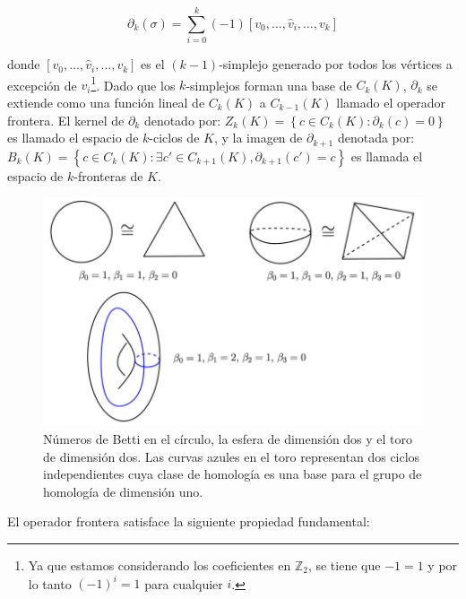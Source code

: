 \begin{equation*}
    \partial_{k}\left(\sigma\right) = \sum_{i=0}^{k}\left(-1\right)
    \left[v_{0},\dots,\hat{v}_{i},\dots,v_{k}\right]
\end{equation*}

\noindent donde $\left[v_{0},\dots,\hat{v}_{i},\dots,v_{k}\right]$ es el $\left(k-1\right)$-simplejo
generado por todos los v\'ertices a excepci\'on de $v_{i}$\footnote{Ya que estamos considerando
los coeficientes en $\mathbb{Z}_{2}$, se tiene que $-1=1$ y por lo tanto $\left(-1\right)^{i}=1$
para cualquier $i$.}. Dado que los $k$-simplejos forman una base de $C_{k}\left(K\right)$,
$\partial_{k}$ se extiende como una funci\'on lineal de $C_{k}\left(K\right)$ a $C_{k-1}\left(K\right)$
llamado el operador frontera. El kernel de $\partial_{k}$ denotado por: $Z_{k}\left(K\right)=
\left\{c\in C_{k}\left(K\right):\partial_{k}\left(c\right)=0\right\}$ es llamado el espacio de
$k$-ciclos de $K$, y la imagen de $\partial_{k+1}$ denotada por: $B_{k}\left(K\right)=
\left\{c\in C_{k}\left(K\right): \exists c' \in C_{k+1}\left(K\right),
\partial_{k+1}\left(c'\right)=c\right\}$ es llamada el espacio de $k$-fronteras de $K$.

\begin{figure}[ht]
    \centering
    \includegraphics[width=0.85\linewidth]{./figures/Figura7.png}
    \caption{
        N\'umeros de Betti en el c\'irculo, la esfera de dimensi\'on dos y el toro de dimensi\'on dos.
        Las curvas azules en el toro representan dos ciclos independientes cuya clase de homolog\'ia
        es una base para el grupo de homolog\'ia de dimensi\'on uno.
    }
    \label{fig:Figura 7}
    \vspace{15pt}
\end{figure}

\newpage

El operador frontera satisface la siguiente propiedad fundamental:


